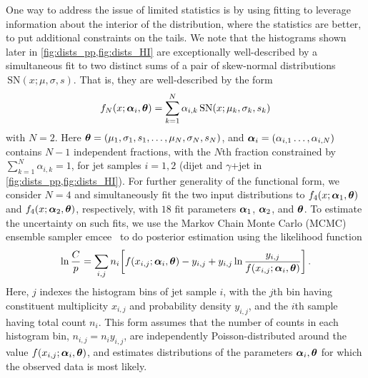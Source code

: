 \documentclass[aps,prl,twocolumn,preprintnumbers,showpacs,floatfix,nofootinbib]{revtex4-1}
\let\originalleft\left
\let\originalright\right
\renewcommand*{\left}{\mathopen{}\mathclose\bgroup\originalleft}
\renewcommand*{\right}{\aftergroup\egroup\originalright}
\newcommand*{\V}[1]{\ensuremath\bm{#1}}
\newcommand*{\emcee}{\textsf{emcee}}
\newcommand*{\SN}{\,\text{SN}}
\begin{document}
One way to address the issue of limited statistics is by using fitting to leverage information about the interior of the distribution, where the statistics are better, to put additional constraints on the tails.
%
We note that the histograms shown later in \cref{fig:dists_pp,fig:dists_HI} are exceptionally well-described by a simultaneous fit to two distinct sums of a pair of skew-normal distributions $\SN(x; \mu, \sigma, s)$.
%
That is, they are well-described by the form
%
\begin{equation}
	f_N(x; \V{\alpha}_i, \V{\theta}) = \sum_{k = 1}^N \alpha_{i, k} \SN(x; \mu_k, \sigma_k, s_k)
\end{equation}
with $N = 2$.
%
Here $\V{\theta} = (\mu_1, \sigma_1, s_1, \dots, \mu_N, \sigma_N, s_N)$, and $\V{\alpha}_i = (\alpha_{i, 1} \dots, \alpha_{i, N})$ contains $N - 1$ independent fractions, with the $N$th fraction constrained by $\sum_{k=1}^{N} \alpha_{i,k} = 1$, for jet samples $i = 1, 2$ (dijet and $\gamma$+jet in \cref{fig:dists_pp,fig:dists_HI}).
%
For further generality of the functional form, we consider $N = 4$ and simultaneously fit the two input distributions to $f_4(x; \V{\alpha}_1, \V{\theta})$ and $f_4(x; \V{\alpha}_2, \V{\theta})$, respectively, with $18$ fit parameters $\V{\alpha}_1$, $\V{\alpha}_2$, and $\V{\theta}$.
%
To estimate the uncertainty on such fits, we use the Markov Chain Monte Carlo (MCMC) ensemble sampler \emcee~\cite{ForemanMackey:2012ig} to do posterior estimation using the likelihood function \cite{Baker:1983tu} 
%
\begin{equation}
	\label{eq:lnlike}
	\ln\frac{C}{p} = \sum_{i, j} n_i \left[ f(x_{i, j}; \V{\alpha}_i, \V{\theta}) - y_{i,j} + y_{i,j} \ln \frac{y_{i,j}}{f(x_{i, j}; \V{\alpha}_i, \V{\theta})}\right]\,.	
\end{equation}
%
Here, $j$ indexes the histogram bins of jet sample $i$, with the $j$th bin having constituent multiplicity $x_{i, j}$ and probability density $y_{i, j}$, and the $i$th sample having total count $n_i$.
%
This form assumes that the number of counts in each histogram bin, $n_{i,j} = n_i y_{i,j}$, are independently Poisson-distributed around the value $f(x_{i, j}; \V{\alpha}_i, \V{\theta})$, and estimates distributions of the parameters $\V{\alpha}_i, \V{\theta}$ for which the observed data is most likely.
\end{document}
